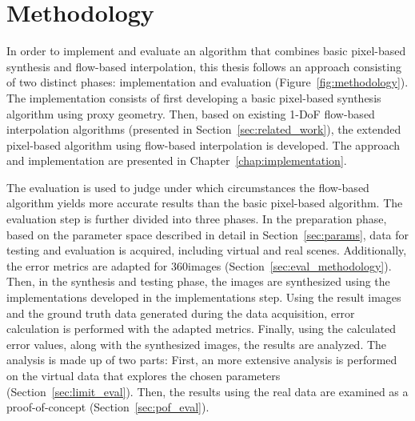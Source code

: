 %
%
%
%

\section*{Methodology}
In order to implement and evaluate an algorithm that combines basic pixel-based synthesis and flow-based interpolation, this thesis follows an approach consisting of two distinct phases: implementation and evaluation (Figure~\ref{fig:methodology}). The implementation consists of first developing a basic pixel-based synthesis algorithm using proxy geometry. Then, based on existing 1-DoF flow-based interpolation algorithms (presented in Section~\ref{sec:related_work}), the extended pixel-based algorithm using flow-based interpolation is developed. The approach and implementation are presented in Chapter~\ref{chap:implementation}.

The evaluation is used to judge under which circumstances the flow-based algorithm yields more accurate results than the basic pixel-based algorithm.
The evaluation step is further divided into three phases. In the preparation phase, based on the parameter space described in detail in Section~\ref{sec:params}, data for testing and evaluation is acquired, including virtual and real scenes. Additionally, the error metrics are adapted for 360\degree images (Section~\ref{sec:eval_methodology}).
Then, in the synthesis and testing phase, the images are synthesized using the implementations developed in the implementations step. Using the result images and the ground truth data generated during the data acquisition, error calculation is performed with the adapted metrics.
Finally, using the calculated error values, along with the synthesized images, the results are analyzed.
The analysis is made up of two parts: First, an more extensive analysis is performed on the virtual data that explores the chosen parameters (Section~\ref{sec:limit_eval}). Then, the results using the real data are examined as a proof-of-concept (Section~\ref{sec:pof_eval}). 

